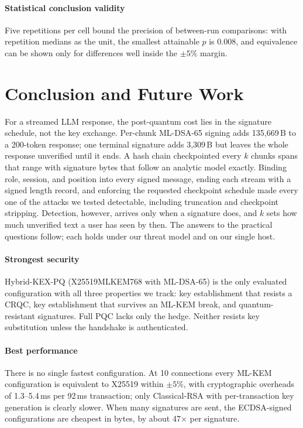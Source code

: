\documentclass[conference]{IEEEtran}
\begin{document}
\paragraph*{Statistical conclusion validity} Five repetitions per cell bound the precision of
between-run comparisons: with repetition medians as the unit, the smallest attainable $p$ is 0.008, and
equivalence can be shown only for differences well inside the $\pm5\%$ margin.

\section{Conclusion and Future Work}
For a streamed LLM response, the post-quantum cost lies in the signature schedule, not the key exchange.
Per-chunk ML-DSA-65 signing adds 135,669\,B to a 200-token response; one terminal signature adds 3,309\,B
but leaves the whole response unverified until it ends. A hash chain checkpointed every $k$ chunks spans
that range with signature bytes that follow an analytic model exactly. Binding role, session, and
position into every signed message, ending each stream with a signed length record, and enforcing the
requested checkpoint schedule made every one of the attacks we tested detectable, including truncation
and checkpoint stripping. Detection, however, arrives only when a signature does, and $k$ sets how much
unverified text a user has seen by then. The answers to the practical questions follow; each holds under
our threat model and on our single host.

\paragraph*{Strongest security} Hybrid-KEX-PQ (X25519MLKEM768 with ML-DSA-65) is the only evaluated
configuration with all three properties we track: key establishment that resists a CRQC, key establishment
that survives an ML-KEM break, and quantum-resistant signatures. Full PQC lacks only the hedge. Neither
resists key substitution unless the handshake is authenticated.

\paragraph*{Best performance} There is no single fastest configuration. At 10 connections every ML-KEM
configuration is equivalent to X25519 within $\pm5\%$, with cryptographic overheads of 1.3--5.4\,ms per
92\,ms transaction; only Classical-RSA with per-transaction key generation is clearly slower. When many
signatures are sent, the ECDSA-signed configurations are cheapest in bytes, by about 47$\times$ per
signature.
\end{document}
